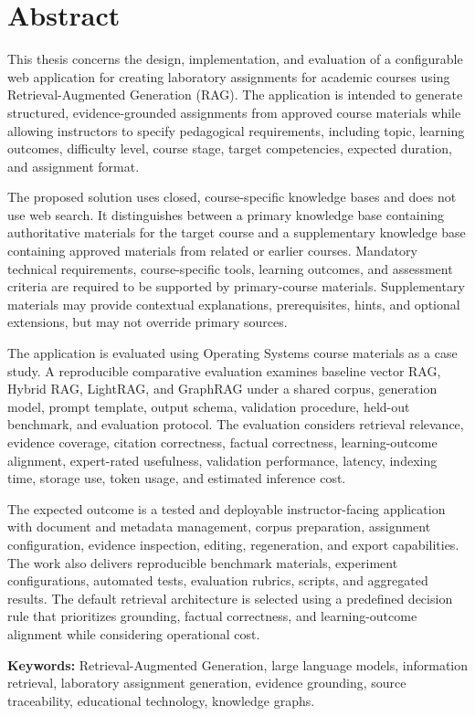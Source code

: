 \documentclass[12pt,a4paper]{report}
\numberwithin{equation}{chapter}
\renewenvironment{abstract}
{%
    \clearpage
    \section*{Abstract}
    \noindent
}
{%
    \par
    \clearpage
}
\begin{document}
\begin{abstract}
This thesis concerns the design, implementation, and evaluation of a configurable web application for creating laboratory assignments for academic courses using Retrieval-Augmented Generation (RAG). The application is intended to generate structured, evidence-grounded assignments from approved course materials while allowing instructors to specify pedagogical requirements, including topic, learning outcomes, difficulty level, course stage, target competencies, expected duration, and assignment format.

The proposed solution uses closed, course-specific knowledge bases and does not use web search. It distinguishes between a primary knowledge base containing authoritative materials for the target course and a supplementary knowledge base containing approved materials from related or earlier courses. Mandatory technical requirements, course-specific tools, learning outcomes, and assessment criteria are required to be supported by primary-course materials. Supplementary materials may provide contextual explanations, prerequisites, hints, and optional extensions, but may not override primary sources.

The application is evaluated using Operating Systems course materials as a case study. A reproducible comparative evaluation examines baseline vector RAG, Hybrid RAG, LightRAG, and GraphRAG under a shared corpus, generation model, prompt template, output schema, validation procedure, held-out benchmark, and evaluation protocol. The evaluation considers retrieval relevance, evidence coverage, citation correctness, factual correctness, learning-outcome alignment, expert-rated usefulness, validation performance, latency, indexing time, storage use, token usage, and estimated inference cost.

The expected outcome is a tested and deployable instructor-facing application with document and metadata management, corpus preparation, assignment configuration, evidence inspection, editing, regeneration, and export capabilities. The work also delivers reproducible benchmark materials, experiment configurations, automated tests, evaluation rubrics, scripts, and aggregated results. The default retrieval architecture is selected using a predefined decision rule that prioritizes grounding, factual correctness, and learning-outcome alignment while considering operational cost.

\textbf{Keywords:} Retrieval-Augmented Generation, large language models, information retrieval, laboratory assignment generation, evidence grounding, source traceability, educational technology, knowledge graphs.
\end{abstract}
\end{document}
